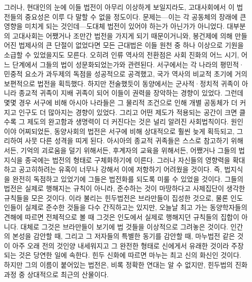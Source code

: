 그러나, 현대인의 눈에 이들 법전이 아무리 이상하게 보일지라도,
고대사회에서 이 법전들의 중요성은 이루 다 말할 수 없을 정도이다.
문제는---이는 각 공동체의 장래에 큰 영향을 미치게 되는 것인데---도대체
법전이 있어야 하는가 아닌가가 아니었다.
대부분의 고대사회는 어쨌거나 조만간 법전을 가지게 되기 때문이거니와,
봉건제에 의해 만들어진 법제사의 큰 단절이 없었다면
모든 근대법은 이들 원천 중 하나 이상으로
기원을 소급할 수 있었을지도 모른다.
오히려 인류 역사의 전환점은
사회 진화의 어느 시기, 어느 단계에서 그들의 법이 성문화되었는가와 관련된다.
서구에서는 각 나라의 평민적^^b7민중적 요소가 과두제의 독점을 성공적으로
공격했고, 국가 역사의 비교적 초기에 거의 보편적으로 법전을 획득했다.
하지만 전술했듯이 동양에서는 군사적^^b7정치적 귀족이 아니라
종교적 귀족이 지배 귀족이 되어 이들이 권력을 장악하는 경향이 있었다.
그런데 몇몇 경우 서구에 비해 아시아 나라들은 그 물리적 조건으로 인해
개별 공동체가 더 커지고 인구도 더 많아지는 경향이 있었다.
그리고 어떤 제도가 적용되는 공간이 크면 클수록
그 제도의 완고함과 생명력이 더 커진다는 것은 널리 알려진 사회법칙이다.
원인이야 어찌되었든, 동양사회의 법전은 서구에 비해
상대적으로 훨씬 늦게 획득되고, 그리하여 사뭇 다른 성격을 띠게 된다.
아시아의 종교적 귀족들은 스스로 참고하기 위해서든, 기억의 괴로움을
덜기 위해서든, 후계자의 교육을 위해서든, 어쨌거나
그들의 법지식을 종국에는 법전의 형태로 구체화하기에 이른다.
그러나 자신들의 영향력을 확대하고 공고히하려는 유혹이 너무나 강해서
이에 저항하기 어려웠을 것이다. 즉,
법지식을 완전히 독점하고 있었기에 그들은
법전화를 되도록 미룰 수 있었을 것이다.
그들의 법전은 실제로 행해지는 규칙이 아니라,
준수하는 것이 마땅하다고 사제집단이 생각한 규칙들을 모은 것이다.
이라 불리는 힌두법전은 브라만들이 집성한 것으로,
물론 인도인들이 실제로 준수한 것들을 다수 간직하고는 있지만,
오늘날 최고 가는 동양학자들의 견해에 따르면
전체적으로 볼 때 그것은 인도에서 실제로 행해지던 규칙들의 집합이 아니다.
대체로 그것은 브라만들이 보기에 법 것들을
이상적으로 그려놓은 것이다.
인간의 본성을 감안할 때, 그리고 그 저자들의 특별한 동기를 감안할 때,
마누법전 같은 것이 아주 오래 전의 것인양 내세워지고
그 완전한 형태로 신에게서 유래한 것이라 주장되는 것은 당연한 일에 속한다.
힌두 신화에 따르면 마누는 최고 신의 화신인 것이다.
하지만 그의 이름이 붙어있는 법전은, 비록 정확한 연대는 알 수 없지만,
힌두법의 진화 과정 중 상대적으로 최근의 산물이다.

